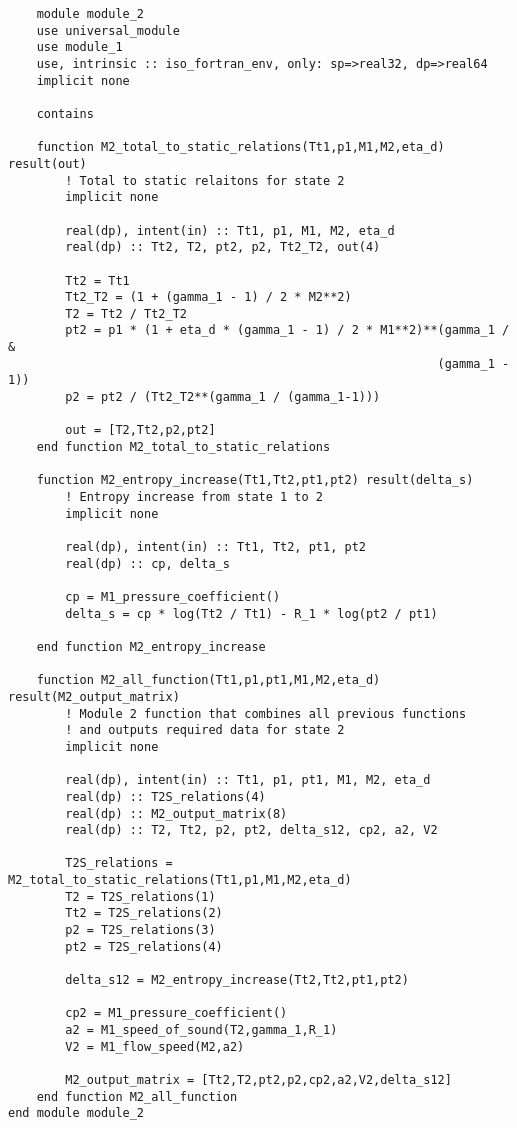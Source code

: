 \begin{verbatim}
    module module_2
    use universal_module
    use module_1
    use, intrinsic :: iso_fortran_env, only: sp=>real32, dp=>real64
    implicit none

    contains

    function M2_total_to_static_relations(Tt1,p1,M1,M2,eta_d) result(out)
        ! Total to static relaitons for state 2
        implicit none

        real(dp), intent(in) :: Tt1, p1, M1, M2, eta_d
        real(dp) :: Tt2, T2, pt2, p2, Tt2_T2, out(4)

        Tt2 = Tt1
        Tt2_T2 = (1 + (gamma_1 - 1) / 2 * M2**2)
        T2 = Tt2 / Tt2_T2
        pt2 = p1 * (1 + eta_d * (gamma_1 - 1) / 2 * M1**2)**(gamma_1 / &
                                                            (gamma_1 - 1))
        p2 = pt2 / (Tt2_T2**(gamma_1 / (gamma_1-1)))

        out = [T2,Tt2,p2,pt2]
    end function M2_total_to_static_relations

    function M2_entropy_increase(Tt1,Tt2,pt1,pt2) result(delta_s)
        ! Entropy increase from state 1 to 2
        implicit none

        real(dp), intent(in) :: Tt1, Tt2, pt1, pt2
        real(dp) :: cp, delta_s

        cp = M1_pressure_coefficient()
        delta_s = cp * log(Tt2 / Tt1) - R_1 * log(pt2 / pt1)

    end function M2_entropy_increase
    
    function M2_all_function(Tt1,p1,pt1,M1,M2,eta_d) result(M2_output_matrix)
        ! Module 2 function that combines all previous functions
        ! and outputs required data for state 2
        implicit none

        real(dp), intent(in) :: Tt1, p1, pt1, M1, M2, eta_d
        real(dp) :: T2S_relations(4)
        real(dp) :: M2_output_matrix(8)
        real(dp) :: T2, Tt2, p2, pt2, delta_s12, cp2, a2, V2

        T2S_relations = M2_total_to_static_relations(Tt1,p1,M1,M2,eta_d)
        T2 = T2S_relations(1)
        Tt2 = T2S_relations(2)
        p2 = T2S_relations(3)
        pt2 = T2S_relations(4)

        delta_s12 = M2_entropy_increase(Tt2,Tt2,pt1,pt2)

        cp2 = M1_pressure_coefficient()
        a2 = M1_speed_of_sound(T2,gamma_1,R_1)
        V2 = M1_flow_speed(M2,a2)

        M2_output_matrix = [Tt2,T2,pt2,p2,cp2,a2,V2,delta_s12]
    end function M2_all_function
end module module_2
\end{verbatim}